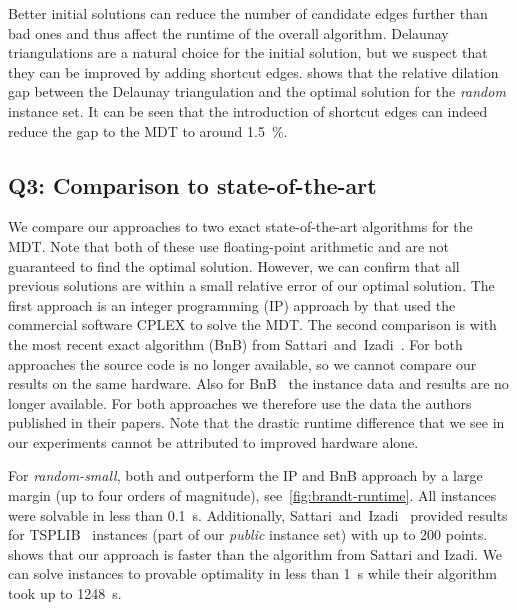 Better initial solutions can reduce the number of candidate edges further than bad ones and thus affect the runtime of the overall algorithm.
Delaunay triangulations are a natural choice for the initial solution, but we suspect that they can be improved by adding shortcut edges.
 shows that the relative dilation gap between the Delaunay triangulation and the optimal solution for the \emph{random} instance set.
It can be seen that the introduction of shortcut edges can indeed reduce the gap to the MDT to around \qty{1.5}{\%}.

\subsection{Q3: Comparison to state-of-the-art}
\label{sec:experiments-comparison-to-existing}

We compare our approaches to two exact state-of-the-art algorithms for the MDT.
Note that both of these use floating-point arithmetic and are not guaranteed to find the optimal solution.
However, we can confirm that all previous solutions are within a small relative error of our optimal solution.
The first approach is an integer programming (IP) approach by \cite{DBLP:conf/cccg/BrandtGSR14} that used the commercial software CPLEX to solve the MDT. 
The second comparison is with the most recent exact algorithm (BnB) from Sattari~and~Izadi~\cite{DBLP:journals/jgo/SattariI17}.
For both approaches the source code is no longer available, so we cannot compare our results on the same hardware.
Also for BnB~\cite{DBLP:journals/jgo/SattariI17} the instance data and results are no longer available. 
For both approaches we therefore use the data the authors published in their papers. 
Note that the drastic runtime difference that we see in our experiments cannot be attributed to improved hardware alone.

For \emph{random-small}, both \incmdt{} and \binmdt{} outperform the IP and BnB approach by a large margin (up to four orders of magnitude), see~\cref{fig:brandt-runtime}.
All instances were solvable in less than \qty{0.1}{s}.
Additionally, Sattari~and~Izadi~\cite{DBLP:journals/jgo/SattariI17} provided results for TSPLIB~\cite{reinelt1991} instances (part of our \emph{public} instance set) with up to \num{200} points.
 shows that our approach is faster than the algorithm from Sattari and Izadi.
We can solve instances to provable optimality in less than \qty{1}{s} while their algorithm took up to \qty{1248}{s}.

